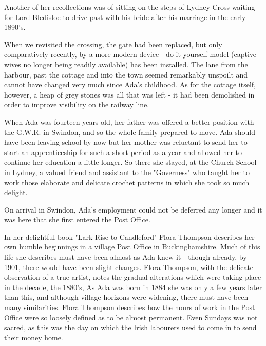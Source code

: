 Another of her recollections was of sitting on the steps of Lydney Cross waiting for Lord Bledisloe to drive past with his bride after his marriage in the early 1890’s.

When we revisited the crossing, the gate had been replaced, but only comparatively recently, by a more modern device - do-it-yourself model (captive wives no longer being readily available) has been installed. The lane from the harbour, past the cottage and into the town seemed remarkably unspoilt and cannot have changed very much since Ada’s childhood. As for the cottage itself, however, a heap of grey stones was all that was left - it had been demolished in order to improve visibility on the railway line.

When Ada was fourteen years old, her father was offered a better position with the G.W.R. in Swindon, and so the whole family prepared to move. Ada should have been leaving school by now but her mother was reluctant to send her to start an apprenticeship for such a short period as a year and allowed her to continue her education a little longer. So there she stayed, at the Church School in Lydney, a valued friend and assistant to the "Governess" who taught her to work those elaborate and delicate crochet patterns in which she took so much delight.

On arrival in Swindon, Ada's employment could not be deferred any longer and it was here that she first entered the Post Office.

In her delightful book "Lark Rise to Candleford" Flora Thompson describes her own humble beginnings in a village Post Office in Buckinghamshire. Much of this life she describes must have been almost as Ada knew it - though already, by 1901, there would have been slight changes. Flora Thompson, with the delicate observation of a true artist, notes the gradual alterations which were taking place in the decade, the 1880's, As Ada was born in 1884 she was only a few years later than this, and although village horizons were widening, there must have been many similarities. Flora Thompson describes how the hours of work in the Post Office were so loosely defined as to be almost permanent. Even Sundays was not sacred, as this was the day on which the Irish labourers used to come in to send their money home.

